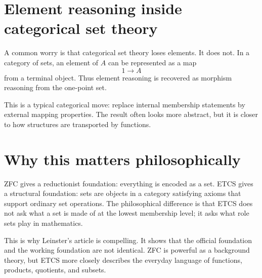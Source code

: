 \section{Element reasoning inside categorical set theory}

A common worry is that categorical set theory loses elements.  It does not.  In a category of sets, an element of \(A\) can be represented as a map
\[
  1\to A
\]
from a terminal object.  Thus element reasoning is recovered as morphism reasoning from the one-point set.

This is a typical categorical move: replace internal membership statements by external mapping properties.  The result often looks more abstract, but it is closer to how structures are transported by functions.

\section{Why this matters philosophically}

ZFC gives a reductionist foundation: everything is encoded as a set.  ETCS gives a structural foundation: sets are objects in a category satisfying axioms that support ordinary set operations.  The philosophical difference is that ETCS does not ask what a set is made of at the lowest membership level; it asks what role sets play in mathematics.

This is why Leinster's article is compelling.  It shows that the official foundation and the working foundation are not identical.  ZFC is powerful as a background theory, but ETCS more closely describes the everyday language of functions, products, quotients, and subsets.
